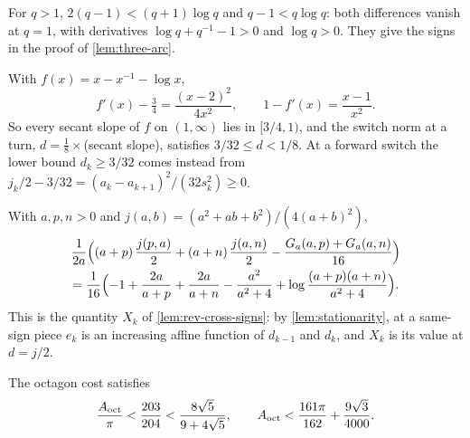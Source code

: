  For $q>1$, $2(q-1)<(q+1)\log q$ and $q-1<q\log q$: both differences vanish
at $q=1$, with derivatives
$\log q+q^{-1}-1>0$ and $\log q>0$. They give the signs in the proof of \cref{lem:three-arc}.

 With $f(x)=x-x^{-1}-\log x$,
\[
  f'(x)-\tfrac34=\frac{(x-2)^2}{4x^2},\qquad 1-f'(x)=\frac{x-1}{x^2}.
\]
So every secant slope of $f$ on $(1,\infty)$ lies in $[3/4,1)$, and the switch norm at a turn,
$d=\frac18\times$(secant slope), satisfies $3/32\le d<1/8$. At a forward switch the lower bound
$d_k\ge3/32$ comes instead from
$j_k/2-3/32=(a_k-a_{k+1})^2/(32s_k^2)\ge0$.

 With $a,p,n>0$ and $j(a,b)=(a^2+ab+b^2)/(4(a+b)^2)$,
\begin{multline*}
  \frac{1}{2a}\Bigl((a+p)\,\frac{j(p,a)}{2}+(a+n)\,\frac{j(a,n)}{2}
  -\frac{G_a(a,p)+G_a(a,n)}{16}\Bigr)\\
  =\frac{1}{16}\Bigl(-1+\frac{2a}{a+p}+\frac{2a}{a+n}-\frac{a^2}{a^2+4}
  +\log\frac{(a+p)(a+n)}{a^2+4}\Bigr).
\end{multline*}
This is the quantity $X_k$ of \cref{lem:rev-cross-signs}: by
\cref{lem:stationarity}, at a same-sign piece $e_k$ is an increasing affine function of
$d_{k-1}$ and $d_k$, and $X_k$ is its value at $d=j/2$.

\begin{lemma}\label{lem:octagon-cost-comparison}
The octagon cost satisfies
\[
 \frac{A_{\mathrm{oct}}}{\pi}<\frac{203}{204}<\frac{8\sqrt5}{9+4\sqrt5},\qquad
 A_{\mathrm{oct}}<\frac{161\pi}{162}+\frac{9\sqrt3}{4000}.
\]
\end{lemma}

